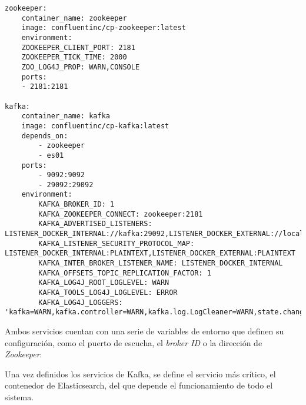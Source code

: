 \begin{lstlisting}[style=yaml, caption={Definición de los servicios de Kafka}]
zookeeper:
	container_name: zookeeper
	image: confluentinc/cp-zookeeper:latest
	environment:
	ZOOKEEPER_CLIENT_PORT: 2181
	ZOOKEEPER_TICK_TIME: 2000
	ZOO_LOG4J_PROP: WARN,CONSOLE
	ports:
	- 2181:2181

kafka:
	container_name: kafka
	image: confluentinc/cp-kafka:latest
	depends_on:
		- zookeeper
		- es01
	ports:
		- 9092:9092
		- 29092:29092
	environment:
		KAFKA_BROKER_ID: 1
		KAFKA_ZOOKEEPER_CONNECT: zookeeper:2181
		KAFKA_ADVERTISED_LISTENERS: LISTENER_DOCKER_INTERNAL://kafka:29092,LISTENER_DOCKER_EXTERNAL://localhost:9092
		KAFKA_LISTENER_SECURITY_PROTOCOL_MAP: LISTENER_DOCKER_INTERNAL:PLAINTEXT,LISTENER_DOCKER_EXTERNAL:PLAINTEXT
		KAFKA_INTER_BROKER_LISTENER_NAME: LISTENER_DOCKER_INTERNAL
		KAFKA_OFFSETS_TOPIC_REPLICATION_FACTOR: 1
		KAFKA_LOG4J_ROOT_LOGLEVEL: WARN
		KAFKA_TOOLS_LOG4J_LOGLEVEL: ERROR
		KAFKA_LOG4J_LOGGERS: 'kafka=WARN,kafka.controller=WARN,kafka.log.LogCleaner=WARN,state.change.logger=WARN,kafka.producer.async.DefaultEventHandler=WARN'
\end{lstlisting}

Ambos servicios cuentan con una serie de variables de entorno que definen su
configuración, como el puerto de escucha, el \textit{broker ID} o la dirección
de \textit{Zookeeper}.

Una vez definidos los servicios de Kafka, se define el servicio más crítico, el
contenedor de Elasticsearch, del que depende el funcionamiento de todo el
sistema.

